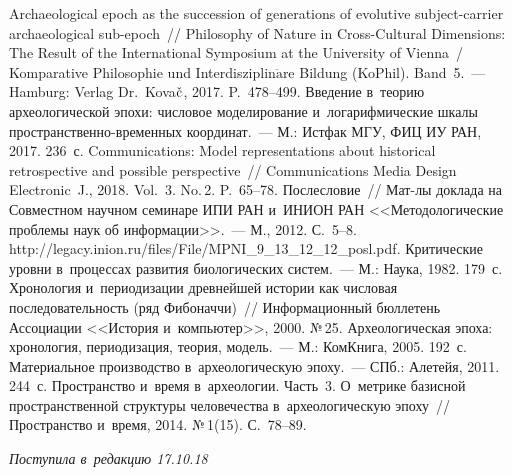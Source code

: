 \begin{multicols}{2}
{{\begin{thebibliography}{99}
 Archaeological epoch as the succession of generations 
of evolutive subject-carrier archaeological sub-epoch~// Philosophy of Nature in Cross-Cultural 
Dimensions: The Result of the International Symposium at the University of Vienna~/ 
Komparative Philosophie und Interdisziplin$\ddot{\mbox{a}}$re Bildung (KoPhil). Band~5.~--- 
Hamburg: Verlag Dr.\ Kova$\Check{\mbox{c}}$, 2017. P.~478--499.
 Введение в~теорию археологической эпохи: 
числовое моделирование и~логарифмические шкалы про\-стран\-ст\-вен\-но-вре\-мен\-ных 
координат.~--- М.: Истфак МГУ, ФИЦ ИУ РАН, 2017. 236~с.
 Communications: Model representations about 
historical retrospective and possible perspective~// Communications Media 
Design Electronic~J., 2018. Vol.~3. No.\,2. P.~65--78.
 Послесловие~// Мат-лы доклада на Совместном научном семинаре 
ИПИ РАН и~\mbox{ИНИОН} РАН <<Методологические проблемы наук об информации>>.~---
М., 2012. С.~5--8. {\sf 
http://legacy.\linebreak inion.ru/files/File/MPNI\_9\_13\_12\_12\_posl.pdf}.
 Критические уровни в~процессах развития 
биологических систем.~--- М.: Наука, 1982. 179~с.
 Хронология и~периодизации древнейшей истории как числовая 
последовательность (ряд Фибоначчи)~// Информационный бюллетень Ассоциации 
<<История и~компьютер>>, 2000. №\,25.
 Археологическая эпоха: хронология, периодизация, теория,  
модель.~--- М.: КомКнига, 2005. 192~с.
 Материальное производство в~археологическую эпоху.~--- СПб.: 
Алетейя, 2011. 244~с.
 Пространство и~время в~археологии. Часть~3. 
О~метрике базисной пространственной структуры человечества в~археологическую 
эпоху~// Пространство и~время, 2014. №\,1(15). С.~78--89.
 \end{thebibliography}

 }
 }

\end{multicols}

\vspace*{-8pt}

\hfill{\small\textit{Поступила в~редакцию 17.10.18}}

\vspace*{6pt}

